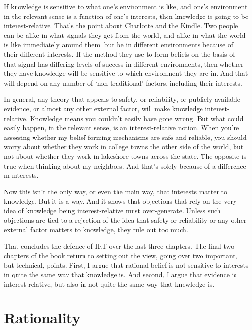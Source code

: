 \documentclass[
  11pt,
]{book}
\begin{document}
If knowledge is sensitive to what one's environment is like, and one's environment in the relevant sense is a function of one's interests, then knowledge is going to be interest-relative. That's the point about Charlotte and the Kindle. Two people can be alike in what signals they get from the world, and alike in what the world is like immediately around them, but be in different environments because of their different interests. If the method they use to form beliefs on the basis of that signal has differing levels of success in different environments, then whether they have knowledge will be sensitive to which environment they are in. And that will depend on any number of `non-traditional' factors, including their interests.

In general, any theory that appeals to safety, or reliability, or publicly available evidence, or almost any other external factor, will make knowledge interest-relative. Knowledge means you couldn't easily have gone wrong. But what could easily happen, in the relevant sense, is an interest-relative notion. When you're assessing whether my belief forming mechanisms are safe and reliable, you should worry about whether they work in college towns the other side of the world, but not about whether they work in lakeshore towns across the state. The opposite is true when thinking about my neighbors. And that's solely because of a difference in interests.

Now this isn't the only way, or even the main way, that interests matter to knowledge. But it is a way. And it shows that objections that rely on the very idea of knowledge being interest-relative must over-generate. Unless such objections are tied to a rejection of the idea that safety or reliability or any other external factor matters to knowledge, they rule out too much.

That concludes the defence of IRT over the last three chapters. The final two chapters of the book return to setting out the view, going over two important, but technical, points. First, I argue that rational belief is not sensitive to interests in quite the same way that knowledge is. And second, I argue that evidence is interest-relative, but also in not quite the same way that knowledge is.

\hypertarget{ratbel}{%
\chapter{Rationality}\label{ratbel}}
\end{document}
